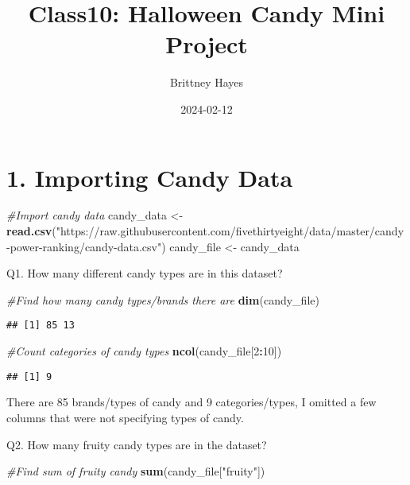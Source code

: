 \documentclass[
]{article}
\title{Class10: Halloween Candy Mini Project}
\author{Brittney Hayes}
\date{2024-02-12}
\newenvironment{Shaded}{\begin{snugshade}}{\end{snugshade}}
\newcommand{\CommentTok}[1]{\textcolor[rgb]{0.56,0.35,0.01}{\textit{#1}}}
\newcommand{\DecValTok}[1]{\textcolor[rgb]{0.00,0.00,0.81}{#1}}
\newcommand{\FunctionTok}[1]{\textcolor[rgb]{0.13,0.29,0.53}{\textbf{#1}}}
\newcommand{\NormalTok}[1]{#1}
\newcommand{\OtherTok}[1]{\textcolor[rgb]{0.56,0.35,0.01}{#1}}
\newcommand{\SpecialCharTok}[1]{\textcolor[rgb]{0.81,0.36,0.00}{\textbf{#1}}}
\newcommand{\StringTok}[1]{\textcolor[rgb]{0.31,0.60,0.02}{#1}}
\begin{document}
\maketitle

\hypertarget{importing-candy-data}{%
\section{1. Importing Candy Data}\label{importing-candy-data}}

\begin{Shaded}
\begin{Highlighting}[]
\CommentTok{\#Import candy data}
\NormalTok{candy\_data }\OtherTok{\textless{}{-}} \FunctionTok{read.csv}\NormalTok{(}\StringTok{"https://raw.githubusercontent.com/fivethirtyeight/data/master/candy{-}power{-}ranking/candy{-}data.csv"}\NormalTok{) }
\NormalTok{candy\_file }\OtherTok{\textless{}{-}}\NormalTok{ candy\_data}
\end{Highlighting}
\end{Shaded}

Q1. How many different candy types are in this dataset?

\begin{Shaded}
\begin{Highlighting}[]
\CommentTok{\#Find how many candy types/brands there are}
\FunctionTok{dim}\NormalTok{(candy\_file)}
\end{Highlighting}
\end{Shaded}

\begin{verbatim}
## [1] 85 13
\end{verbatim}

\begin{Shaded}
\begin{Highlighting}[]
\CommentTok{\#Count categories of candy types}
\FunctionTok{ncol}\NormalTok{(candy\_file[}\DecValTok{2}\SpecialCharTok{:}\DecValTok{10}\NormalTok{])}
\end{Highlighting}
\end{Shaded}

\begin{verbatim}
## [1] 9
\end{verbatim}

There are 85 brands/types of candy and 9 categories/types, I omitted a
few columns that were not specifying types of candy.

Q2. How many fruity candy types are in the dataset?

\begin{Shaded}
\begin{Highlighting}[]
\CommentTok{\#Find sum of fruity candy}
\FunctionTok{sum}\NormalTok{(candy\_file[}\StringTok{"fruity"}\NormalTok{])}
\end{Highlighting}
\end{Shaded}
\end{document}
